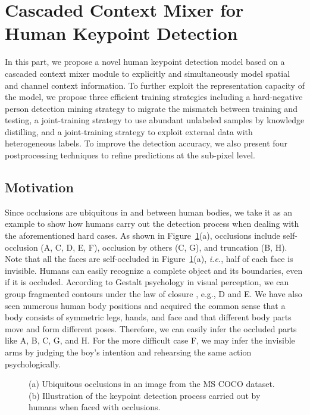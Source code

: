 \documentclass[twocolumn]{svjour3}          \smartqed  \usepackage{natbib}
\begin{document}
\section{Cascaded Context Mixer for Human Keypoint Detection}
\label{sec:method}
In this part, we propose a novel human keypoint detection model based on a cascaded context mixer module to explicitly and simultaneously model spatial and channel context information. To further exploit the representation capacity of the model, we propose three efficient training strategies including a hard-negative person detection mining strategy to migrate the mismatch between training and testing, a joint-training strategy to use abundant unlabeled samples by knowledge distilling, and a joint-training strategy to exploit external data with heterogeneous labels. To improve the detection accuracy, we also present four postprocessing techniques to refine predictions at the sub-pixel level.


\subsection{Motivation}
\label{subsec:motivation}
Since occlusions are ubiquitous in and between human bodies, we take it as an example to show how humans carry out the detection process when dealing with the aforementioned hard cases. As shown in Figure~\ref{fig:motivation}(a), occlusions include self-occlusion (A, C, D, E, F), occlusion by others (C, G), and truncation (B, H). Note that all the faces are self-occluded in Figure~\ref{fig:motivation}(a), \emph{i.e.}, half of each face is invisible. Humans can easily recognize a complete object and its boundaries, even if it is occluded. According to Gestalt psychology in visual perception, we can group fragmented contours under the law of closure \citep{wagemans2012century}, e.g., D and E. We have also seen numerous human body positions and acquired the common sense that a body consists of symmetric legs, hands, and face and that different body parts move and form different poses. Therefore, we can easily infer the occluded parts like A, B, C, G, and H. For the more difficult case F, we may infer the invisible arms by judging the boy's intention and rehearsing the same action psychologically.

\begin{figure}[t]
\centering
{}
\vspace{0.0001\linewidth}

\caption{(a) Ubiquitous occlusions in an image from the MS COCO dataset. (b) Illustration of the keypoint detection process carried out by humans when faced with occlusions.}
\label{fig:motivation}
\end{figure}
\end{document}

